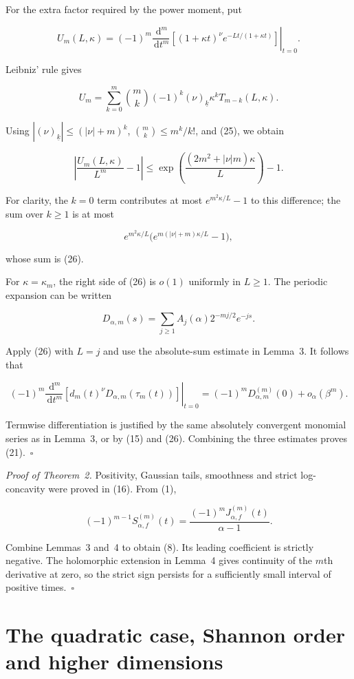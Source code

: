\documentclass[
  11pt,
]{article}
\begin{document}
For the extra factor required by the power moment, put

\[
U_m(L,\kappa)=(-1)^m\left.\frac{\,\mathrm d^m}{\,\mathrm dt^m}
  \left[(1+\kappa t)^\nu e^{-Lt/(1+\kappa t)}\right]\right|_{t=0}.
\]

Leibniz' rule gives

\[
U_m=
 \sum_{k=0}^m\binom mk(-1)^k(\nu )_{\underline{k}}\kappa^k
       T_{m-k}(L,\kappa).
\]

Using \(|(\nu )_{\underline{k}}|\leq(|\nu|+m)^k\),
\(\binom mk\leq m^k/k!\), and (25), we obtain

\[
\tag{26}
 \left|\frac{U_m(L,\kappa)}{L^m}-1\right|
 \leq
 \exp\!\left(\frac{(2m^2+|\nu|m)\kappa}{L}\right)-1.
\]

For clarity, the \(k=0\) term contributes at most \(e^{m^2\kappa/L}-1\)
to this difference; the sum over \(k\geq1\) is at most

\[
e^{m^2\kappa/L}
   \big(e^{m(|\nu|+m)\kappa/L}-1\big),
\]

whose sum is (26).

For \(\kappa=\kappa_m\), the right side of (26) is \(o(1)\) uniformly in
\(L\geq1\). The periodic expansion can be written

\[
D_{\alpha,m}(s)=\sum_{j\geq1}A_j(\alpha)2^{-mj/2}e^{-js}.
\]

Apply (26) with \(L=j\) and use the absolute-sum estimate in Lemma~3. It
follows that

\[
(-1)^m\left.\frac{\,\mathrm d^m}{\,\mathrm dt^m}
       [d_m(t)^\nu D_{\alpha,m}(\tau_m(t))]\right|_{t=0}
 =(-1)^mD_{\alpha,m}^{(m)}(0)+o_\alpha(\beta^m).
\]

Termwise differentiation is justified by the same absolutely convergent
monomial series as in Lemma~3, or by (15) and (26). Combining the three
estimates proves (21).~\(\square\)

\emph{Proof of Theorem~2.} Positivity, Gaussian tails, smoothness and
strict log-concavity were proved in (16). From (1),

\[
(-1)^{m-1}S_{\alpha,f}^{(m)}(t)
 =\frac{(-1)^mJ_{\alpha,f}^{(m)}(t)}{\alpha-1}.
\]

Combine Lemmas~3 and~4 to obtain (8). Its leading coefficient is
strictly negative. The holomorphic extension in Lemma~4 gives continuity
of the \(m\)th derivative at zero, so the strict sign persists for a
sufficiently small interval of positive times.~\(\square\)

\section{The quadratic case, Shannon order and higher
dimensions}\label{the-quadratic-case-shannon-order-and-higher-dimensions}
\end{document}
